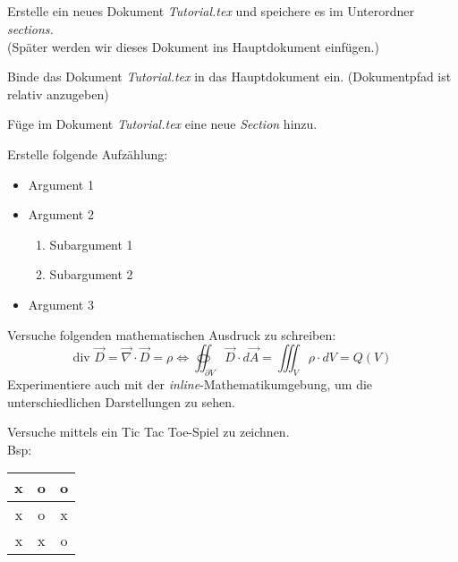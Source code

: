 \subsection{}
	\begin{aufgabe}
		Erstelle ein neues Dokument \textit{\glqq Tutorial.tex\grqq{}} und speichere es im Unterordner \textit{\glqq sections\grqq.}\\(Später werden wir dieses Dokument ins Hauptdokument einfügen.)
	\end{aufgabe}
	
	\begin{aufgabe}
		Binde das Dokument \textit{\glqq Tutorial.tex\grqq{}} in das Hauptdokument ein. (Dokumentpfad ist relativ anzugeben)
	\end{aufgabe}
	
	\begin{aufgabe}
		Füge im Dokument \textit{\glqq Tutorial.tex\grqq{}} eine neue \textit{Section} hinzu. 
	\end{aufgabe}
	
	\begin{aufgabe}
		Erstelle folgende Aufzählung:
		\begin{itemize}	
			\item Argument 1
			\item Argument 2
			\begin{enumerate}
				\item Subargument 1
				\item Subargument 2
			\end{enumerate}
			\item Argument 3
		\end{itemize}
	\end{aufgabe}
	
	\begin{aufgabe}
		Versuche folgenden mathematischen Ausdruck zu schreiben:
		\[ \text{div } \vec{D} = \vec{\nabla} \cdot \vec{D} = \rho \Leftrightarrow \oiint_{\partial V}\vec{D}\cdot d\vec{A} = \iiint_V \rho \cdot dV = Q(V) \]
		Experimentiere auch mit der \textit{inline}-Mathematikumgebung, um die unterschiedlichen Darstellungen zu sehen. 
	\end{aufgabe}
	
	\begin{aufgabe}
		Versuche mittels  ein Tic Tac Toe-Spiel zu zeichnen.\\
		Bsp:
		\begin{tabular}{c|c|c}
			x & o & o\\ \hline
			x & o & x\\ \hline
			x & x & o\\
		\end{tabular}
		
	\end{aufgabe}
	
